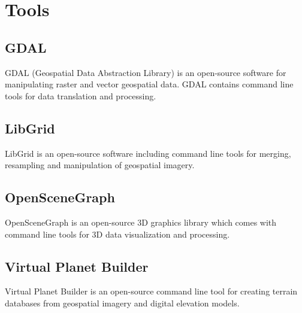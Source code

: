 \chapter{Tools}

\section{GDAL}

GDAL (Geospatial Data Abstraction Library) is an open-source software for manipulating raster and vector geospatial data. GDAL contains command line tools for data translation and processing. \cite{Terrain-ToolsGDAL}

\section{LibGrid}

LibGrid is an open-source software including command line tools for merging, resampling and manipulation of geospatial imagery. \cite{Terrain-ToolsLibGrid}

\section{OpenSceneGraph}

OpenSceneGraph is an open-source 3D graphics library which comes with command line tools for 3D data visualization and processing.

\section{Virtual Planet Builder}

Virtual Planet Builder is an open-source command line tool for creating terrain databases from geospatial imagery and digital elevation models. \cite{Terrain-ToolsVPB}
